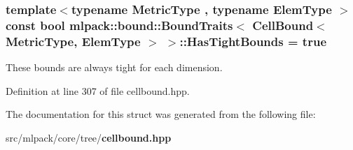 \subsubsection[{Has\+Tight\+Bounds}]{\setlength{\rightskip}{0pt plus 5cm}template$<$typename Metric\+Type , typename Elem\+Type $>$ const bool {\bf mlpack\+::bound\+::\+Bound\+Traits}$<$ {\bf Cell\+Bound}$<$ Metric\+Type, Elem\+Type $>$ $>$\+::Has\+Tight\+Bounds = true\hspace{0.3cm}{\ttfamily [static]}}\label{structmlpack_1_1bound_1_1BoundTraits_3_01CellBound_3_01MetricType_00_01ElemType_01_4_01_4_a68fcd478e7d6adaf7c5d2c03434fed54}


These bounds are always tight for each dimension. 



Definition at line 307 of file cellbound.\+hpp.



The documentation for this struct was generated from the following file\+:\begin{DoxyCompactItemize}
\item 
src/mlpack/core/tree/{\bf cellbound.\+hpp}\end{DoxyCompactItemize}
